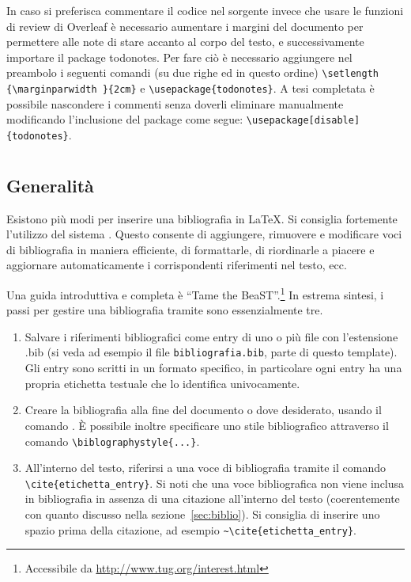 In caso si preferisca commentare il codice nel sorgente invece che usare le funzioni di review di Overleaf è necessario aumentare i margini del documento per permettere alle note di stare accanto al corpo del testo, e successivamente importare il package todonotes. Per fare ciò è necessario aggiungere nel preambolo i seguenti comandi (su due righe ed in questo ordine) \verb|\setlength {\marginparwidth }{2cm}| e \verb|\usepackage{todonotes}|. A tesi completata è possibile nascondere i commenti senza doverli eliminare manualmente modificando l'inclusione del package come segue: \verb|\usepackage[disable]{todonotes}|.


\section{}
\label{sec:bibtex}

\subsection{Generalit\`a}

Esistono più modi per inserire una bibliografia in \LaTeX. Si consiglia fortemente l'utilizzo del sistema . Questo consente di aggiungere, rimuovere e modificare voci di bibliografia in maniera efficiente, di formattarle, di riordinarle a piacere e aggiornare automaticamente i corrispondenti riferimenti nel testo, ecc.

Una guida introduttiva e completa \`e ``Tame the BeaST''.\footnote{Accessibile da \url{http://www.tug.org/interest.html}} 
In estrema sintesi, i passi per gestire una bibliografia tramite  sono essenzialmente tre.
\begin{enumerate}
\item Salvare i riferimenti bibliografici come entry di uno o pi\`u file con l'estensione .bib (si veda ad esempio il file \texttt{bibliografia.bib}, parte di questo template). Gli entry sono scritti in un formato specifico, in particolare ogni entry ha una propria etichetta testuale che lo identifica univocamente.
\item Creare la bibliografia alla fine del documento o dove desiderato, usando il comando \verb||. \`E possibile inoltre specificare uno stile bibliografico attraverso il comando \verb|\biblographystyle{...}|.
\item All'interno del testo, riferirsi a una voce di bibliografia tramite il comando\\ \verb|\cite{etichetta_entry}|. Si noti che una voce bibliografica non viene inclusa in bibliografia in assenza di una citazione all'interno del testo (coerentemente con quanto discusso nella sezione~\ref{sec:biblio}).
Si consiglia di inserire uno spazio prima della citazione, ad esempio \verb|~\cite{etichetta_entry}|.
\end{enumerate}

